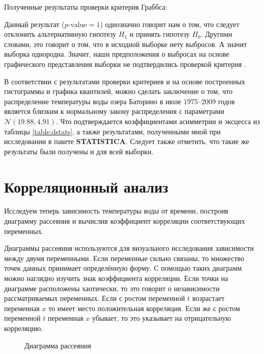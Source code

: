 Полученные результаты проверки критерия Граббса:

Данный результат ($p\textrm{-value} = 1$) однозначно говорит нам о том, что следует отклонить альтернативную гипотезу $H_{1}$ и принять гипотезу $H_{0}$. Другими словами, это говорит о том, что в исходной выборке нету выбросов. А значит выборка однородна. Значит, наши предположения о выбросах на основе графического представления выборки не подтвердились проверкой критерия \cite{Grubbs1950Sample}.

В соответствии с результатами проверки критериев и на основе построенных гистограммы и графика квантилей, можно сделать заключение о том, что распределение температуры воды озера Баторино в июле 1975--2009 годов является близким к нормальному закону распределения с параметрами $\mathcal{N}(19.88, 4.91)$. Что подтверждается коэффициентами асимметрии и эксцесса из таблицы \ref{table:dstats}, а также результатами, полученными мной при исследовании в пакете \textbf{STATISTICA}. Следует также отметить, что такие же результаты были получены и для всей выборки.


\section{Корреляционный анализ} %
\label{sec:corr_analysis}

Исследуем теперь зависимость температуры воды от времени, построив диаграмму рассеяния и вычислив коэффициент корреляции соответствующих переменных.

Диаграммы рассеяния используются для визуального исследования зависимости между двумя переменными. Если переменные сильно связаны, то множество точек данных принимает определённую форму. С помощью таких диаграмм можно наглядно изучить знак коэффициента корреляции. Если точки на диаграмме расположены хаотически, то это говорит о независимости рассматриваемых переменных. Если с ростом переменной $t$ возрастает переменная $x$ то имеет место положительная корреляция. Если же с ростом переменной $t$ переменная $x$ убывает, то это указывает на отрицательную корреляцию. 
\begin{figure}[ht]
\caption{Диаграмма рассеяния}
\label{img:scatterplot}
\end{figure}

